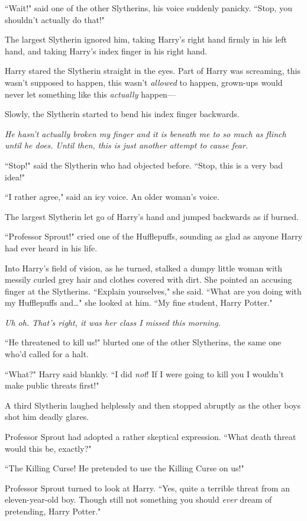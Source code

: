 ``Wait!" said one of the other Slytherins, his voice suddenly panicky. ``Stop, you shouldn't actually do that!"

The largest Slytherin ignored him, taking Harry's right hand firmly in his left hand, and taking Harry's index finger in his right hand.

Harry stared the Slytherin straight in the eyes. Part of Harry was screaming, this wasn't supposed to happen, this wasn't \emph{allowed} to happen, grown-ups would never let something like this \emph{actually} happen—

Slowly, the Slytherin started to bend his index finger backwards.

\emph{He hasn't actually broken my finger and it is beneath me to so much as flinch until he does. Until then, this is just another attempt to cause fear.}

``Stop!" said the Slytherin who had objected before. ``Stop, this is a very bad idea!"

``I rather agree," said an icy voice. An older woman's voice.

The largest Slytherin let go of Harry's hand and jumped backwards as if burned.

``Professor Sprout!" cried one of the Hufflepuffs, sounding as glad as anyone Harry had ever heard in his life.

Into Harry's field of vision, as he turned, stalked a dumpy little woman with messily curled grey hair and clothes covered with dirt. She pointed an accusing finger at the Slytherins. ``Explain yourselves," she said. ``What are you doing with my Hufflepuffs and{\ldots}" she looked at him. ``My fine student, Harry Potter."

\emph{Uh oh. That's right, it was \emph{her} class I missed this morning.}

``He threatened to kill us!" blurted one of the other Slytherins, the same one who'd called for a halt.

``What?" Harry said blankly. ``I did \emph{not}! If I were going to kill you I wouldn't make public threats first!"

A third Slytherin laughed helplessly and then stopped abruptly as the other boys shot him deadly glares.

Professor Sprout had adopted a rather skeptical expression. ``What death threat would this be, exactly?"

``The Killing Curse! He pretended to use the Killing Curse on us!"

Professor Sprout turned to look at Harry. ``Yes, quite a terrible threat from an eleven-year-old boy. Though still not something you should \emph{ever} dream of pretending, Harry Potter."


